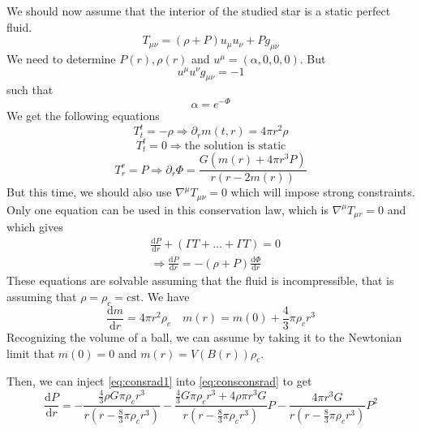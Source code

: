 \documentclass[a4paper]{book}
\theoremstyle{definition}
\theoremstyle{remark}
\begin{document}
We should now assume that the interior of the studied star is a static perfect fluid. 
\begin{equation}
    T_{\mu\nu} = (\rho + P)u_\mu u_\nu + Pg_{\mu\nu}
\end{equation}
We need to determine $P(r), \rho(r)$ and $u^\mu = (\alpha, 0, 0, 0)$. But 
\begin{equation}
    u^\mu u^\nu g_{\mu\nu} = -1
\end{equation}
such that 
\begin{equation}
    \alpha = e^{-\Phi}
\end{equation}
We get the following equations
\begin{equation}
    T^t_t = -\rho \Rightarrow \partial_r m(t, r) = 4\pi r^2 \rho
\end{equation}
\begin{equation}
    T^t_t = 0 \Rightarrow \text{the solution is static}
\end{equation}
\begin{equation}
    T^r_r = P \Rightarrow \partial_r \Phi = \frac{G(m(r) + 4\pi r^3 P)}{r(r-2m(r))}
\label{eq:consrad1}\end{equation}
But this time, we should also use $\nabla^\mu T_{\mu\nu} = 0$ which will impose strong constraints. Only one equation can be used in this conservation law, which is $\nabla^\mu T_{\mu r} = 0$ and which gives 
\begin{equation}
   \begin{aligned}
    &\frac{\text{d}P}{\text{d}r} + (\Gamma T + \dots + \Gamma T) = 0 \\
    &\Rightarrow \frac{\text{d}P}{\text{d}r} = -(\rho + P)\frac{\text{d}\Phi}{\text{d}r}
   \end{aligned}
\label{eq:consconsrad}\end{equation}
These equations are solvable assuming that the fluid is incompressible, that is assuming that $\rho = \rho_c = \text{cst}$. We have 
\begin{equation}
    \frac{\text{d}m}{\text{d}r} = 4\pi r^2 \rho_c \quad m(r) = m(0) + \frac{4}{3}\pi \rho_c r^3
\end{equation}
Recognizing the volume of a ball, we can assume by taking it to the Newtonian limit that $m(0) = 0$ and $m(r) = V(B(r)) \rho_c $. \par \medskip 

Then, we can inject \eqref{eq:consrad1} into \eqref{eq:consconsrad} to get 
\begin{equation}
    \frac{\text{d}P}{\text{d}r} = -\frac{\frac{4}{3}\rho G\pi \rho_c r^3}{r(r-\frac{8}{3}\pi \rho_c r^3)} - \frac{\frac{4}{3}G\pi \rho_c r^3 + 4\rho\pi r^3 G}{r(r-\frac{8}{3}\pi \rho_c r^3)}P - \frac{4\pi r^3 G}{r(r-\frac{8}{3}\pi \rho_c r^3)}P^2
\end{equation}
\end{document}
